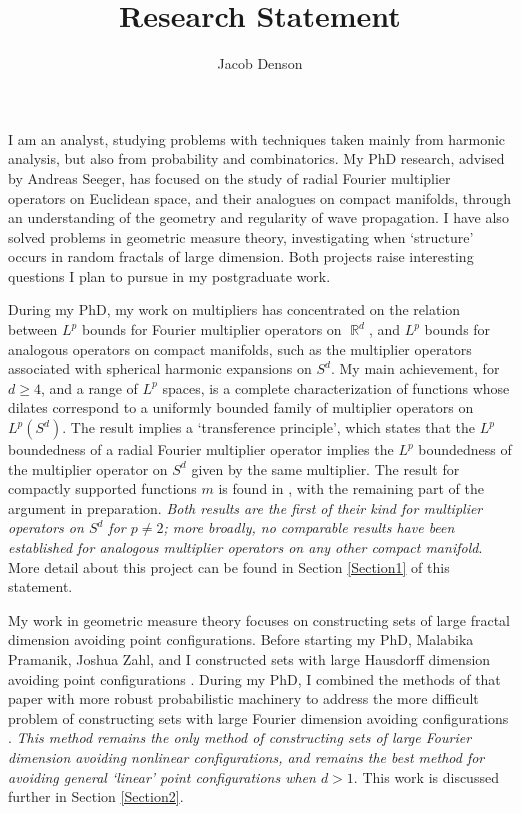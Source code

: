 \documentclass[11pt]{article}
\title{\vspace{-2em}Research Statement}
\author{Jacob Denson}
\date{}
\DeclareMathOperator{\RR}{\mathbb{R}}
\begin{document}
\maketitle

I am an analyst, studying problems with techniques taken mainly from harmonic analysis, but also from probability and combinatorics. My PhD research, advised by Andreas Seeger, has focused on the study of radial Fourier multiplier operators on Euclidean space, and their analogues on compact manifolds, through an understanding of the geometry and regularity of wave propagation. I have also solved problems in geometric measure theory, investigating when `structure' occurs in random fractals of large dimension. Both projects raise interesting questions I plan to pursue in my postgraduate work.

During my PhD, my work on multipliers has concentrated on the relation between $L^p$ bounds for Fourier multiplier operators on $\RR^d$, and $L^p$ bounds for analogous operators on compact manifolds, such as the multiplier operators associated with spherical harmonic expansions on $S^d$. My main achievement, for $d \geq 4$, and a range of $L^p$ spaces, is a complete characterization of functions whose dilates correspond to a uniformly bounded family of multiplier operators on $L^p(S^d)$. The result implies a `transference principle', which states that the $L^p$ boundedness of a radial Fourier multiplier operator implies the $L^p$ boundedness of the multiplier operator on $S^d$ given by the same multiplier. %
The result for compactly supported functions $m$ is found in \cite{DensonCharacterization}, with the remaining part of the argument in preparation. \emph{Both results are the first of their kind for multiplier operators on $S^d$ for $p \neq 2$; more broadly, no comparable results have been established for analogous multiplier operators on any other compact manifold}. More detail about this project can be found in Section \ref{Section1} of this statement.

%
%
%
%

My work in geometric measure theory focuses on constructing sets of large fractal dimension avoiding point configurations. Before starting my PhD, Malabika Pramanik, Joshua Zahl, and I constructed sets with large Hausdorff dimension avoiding point configurations \cite{DensonPramanikZahl}. During my PhD, I combined the methods of that paper with more robust probabilistic machinery to address the more difficult problem of constructing sets with large Fourier dimension avoiding configurations \cite{DensonFourier}. \emph{This method remains the only method of constructing sets of large Fourier dimension avoiding nonlinear configurations, and remains the best method for avoiding general `linear' point configurations when $d > 1$}. This work is discussed further in Section \ref{Section2}.
\end{document}
